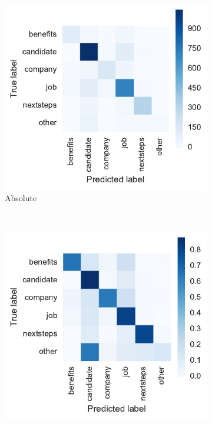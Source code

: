 

\begin{figure}[h]
    \centering
    \begin{subfigure}[b]{0.47\textwidth}
        \includegraphics[width=\textwidth]{img/exp-vector-space-conf-matrix-logreg.pdf}
        \caption{Absolute}
        \label{fig:exp-vector-space-conf-matrix-logreg}
    \end{subfigure}
    ~
    \begin{subfigure}[b]{0.48\textwidth}
        \includegraphics[width=\textwidth]{img/exp-vector-space-conf-matrix-logreg-normalized.pdf}

\end{subfigure}
\end{figure}
